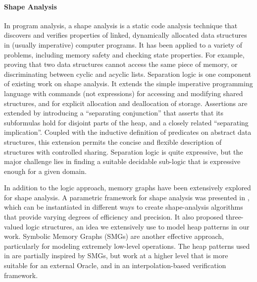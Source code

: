 \paragraph{Shape Analysis}
In program analysis, a shape analysis is a static code analysis technique that discovers
and verifies properties of linked, dynamically allocated data structures in (usually
imperative) computer programs. It has been applied to a variety of problems, including
memory safety and checking state properties. For example, proving that two data
structures cannot access the same piece of memory, or discriminating between cyclic and
acyclic lists. Separation logic \cite{calcagano11,reynolds02} is one component of
existing work on shape analysis. It extends the simple imperative programming language
with commands (not expressions) for accessing and modifying shared structures, and for
explicit allocation and deallocation of storage. Assertions are extended by introducing
a ``separating conjunction'' that asserts that its subformulas hold for disjoint parts
of the heap, and a closely related ``separating implication''. Coupled with the
inductive definition of predicates on abstract data structures, this extension permits
the concise and flexible description of structures with controlled sharing. Separation
logic is quite expressive, but the major challenge lies in finding a suitable decidable
sub-logic that is expressive enough for a given domain.

In addition to the logic approach, memory graphs have been extensively explored for
shape analysis. A parametric framework for shape analysis was presented in
\cite{sagiv02}, which can be instantiated in different ways to create shape-analysis
algorithms that provide varying degrees of efficiency and precision. It also proposed
three-valued logic structures, an idea we extensively use to model heap patterns in our
work. Symbolic Memory Graphs (SMGs) \cite{dudka13} are another effective approach,
particularly for modeling extremely low-level operations. The heap patterns used in
\verifier are partially inspired by SMGs, but work at a higher level that is more
suitable for an external Oracle, and in an interpolation-based verification framework.

